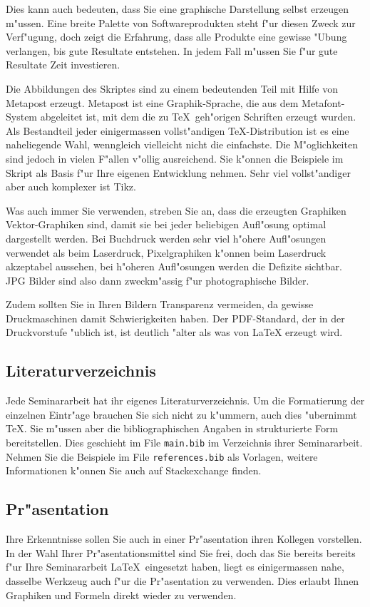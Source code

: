 \documentclass[a4paper,12pt]{article}
\begin{document}
Dies kann auch bedeuten, dass Sie eine graphische Darstellung selbst
erzeugen m"ussen.
Eine breite Palette von Softwareprodukten steht f"ur diesen Zweck
zur Verf"ugung, doch zeigt die Erfahrung, dass alle Produkte
eine gewisse "Ubung verlangen, bis gute Resultate entstehen.
In jedem Fall m"ussen Sie f"ur gute Resultate Zeit investieren.

Die Abbildungen des Skriptes sind zu einem bedeutenden Teil mit
Hilfe von Metapost erzeugt.
Metapost ist eine Graphik-Sprache, die aus dem Metafont-System abgeleitet ist,
mit dem die zu \TeX\ geh"origen Schriften erzeugt wurden.
Als Bestandteil jeder einigermassen vollst"andigen \TeX-Distribution
ist es eine naheliegende Wahl, wenngleich vielleicht nicht die einfachste.
Die M"oglichkeiten sind jedoch in vielen F"allen v"ollig ausreichend.
Sie k"onnen die Beispiele im Skript als Basis f"ur Ihre eigenen Entwicklung
nehmen.
Sehr viel vollst"andiger aber auch komplexer ist Tikz.

Was auch immer Sie verwenden, streben Sie an, dass die erzeugten Graphiken
Vektor-Graphiken sind, damit sie bei jeder beliebigen Aufl"osung
optimal dargestellt werden.
Bei Buchdruck werden sehr viel h"ohere Aufl"osungen verwendet als
beim Laserdruck, Pixelgraphiken k"onnen beim Laserdruck akzeptabel
aussehen, bei h"oheren Aufl"osungen werden die Defizite sichtbar.
JPG Bilder sind also dann zweckm"assig f"ur photographische Bilder.

Zudem sollten Sie in Ihren Bildern Transparenz vermeiden, da gewisse
Druckmaschinen damit Schwierigkeiten haben. Der PDF-Standard, der
in der Druckvorstufe "ublich ist, ist deutlich "alter als was von
\LaTeX{} erzeugt wird.

\subsection{Literaturverzeichnis}
Jede Seminararbeit hat ihr eigenes Literaturverzeichnis.
Um die Formatierung der einzelnen Eintr"age brauchen Sie sich nicht
zu k"ummern, auch dies "ubernimmt \TeX.
Sie m"ussen aber die bibliographischen Angaben in strukturierte
Form bereitstellen. 
Dies geschieht im File \texttt{main.bib} im Verzeichnis ihrer
Seminararbeit.
Nehmen Sie die Beispiele im File \texttt{references.bib} als
Vorlagen, weitere Informationen k"onnen Sie auch auf Stackexchange finden.

\subsection{Pr"asentation}
Ihre Erkenntnisse sollen Sie auch in einer Pr"asentation ihren Kollegen
vorstellen.
In der Wahl Ihrer Pr"asentationsmittel sind Sie frei, doch das Sie
bereits bereits f"ur Ihre Seminararbeit \LaTeX\ eingesetzt haben, 
liegt es einigermassen nahe, dasselbe Werkzeug auch f"ur die Pr"asentation
zu verwenden.
Dies erlaubt Ihnen Graphiken und Formeln direkt wieder zu verwenden.
\end{document}
